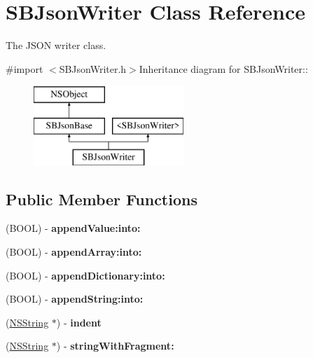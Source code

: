 \hypertarget{interface_s_b_json_writer}{
\section{SBJsonWriter Class Reference}
\label{interface_s_b_json_writer}
}


The JSON writer class.  


{\ttfamily \#import $<$SBJsonWriter.h$>$}Inheritance diagram for SBJsonWriter::\begin{figure}[H]
\begin{center}
\leavevmode
\includegraphics[height=3cm]{interface_s_b_json_writer}
\end{center}
\end{figure}
\subsection*{Public Member Functions}
\begin{DoxyCompactItemize}
\item 
\hypertarget{interface_s_b_json_writer_a4364dcbbe231d0fcd36e12efaf107f51}{
(BOOL) -\/ {\bfseries appendValue:into:}}
\label{interface_s_b_json_writer_a4364dcbbe231d0fcd36e12efaf107f51}

\item 
\hypertarget{interface_s_b_json_writer_a5d28358c936d8c3325add8b9cf9c11f2}{
(BOOL) -\/ {\bfseries appendArray:into:}}
\label{interface_s_b_json_writer_a5d28358c936d8c3325add8b9cf9c11f2}

\item 
\hypertarget{interface_s_b_json_writer_ae7b697af01ff6197a5bf1f1cc5eba887}{
(BOOL) -\/ {\bfseries appendDictionary:into:}}
\label{interface_s_b_json_writer_ae7b697af01ff6197a5bf1f1cc5eba887}

\item 
\hypertarget{interface_s_b_json_writer_aa3803962660a20ecec9f100bbd393ff6}{
(BOOL) -\/ {\bfseries appendString:into:}}
\label{interface_s_b_json_writer_aa3803962660a20ecec9f100bbd393ff6}

\item 
\hypertarget{interface_s_b_json_writer_aff5108b4c65eb132d710db30ca1a3d03}{
(\hyperlink{class_n_s_string}{NSString} $\ast$) -\/ {\bfseries indent}}
\label{interface_s_b_json_writer_aff5108b4c65eb132d710db30ca1a3d03}

\item 
\hypertarget{interface_s_b_json_writer_aa62c0d5ef6acbc23be9242a34f25524f}{
(\hyperlink{class_n_s_string}{NSString} $\ast$) -\/ {\bfseries stringWithFragment:}}
\label{interface_s_b_json_writer_aa62c0d5ef6acbc23be9242a34f25524f}

\end{DoxyCompactItemize}


